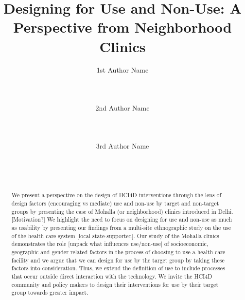 \documentclass{sigchi}
\begin{document}
\title{Designing for Use and Non-Use: A Perspective from Neighborhood Clinics}
\author{
  \alignauthor 1st Author Name\\
    \\
    \\
    \\
  \alignauthor 2nd Author Name\\
    \\
    \\
    \\
  \alignauthor 3rd Author Name\\
    \\
    \\
    \\
}

\maketitle

\begin{abstract}
We present a perspective on the design of HCI4D interventions through the lens of design factors (encouraging vs mediate) use and non-use by target and non-target groups by presenting the case of Mohalla (or neighborhood) clinics introduced in Delhi. [Motivation?] We highlight the need to focus on designing for use and non-use as much as usability by presenting our findings from a multi-site ethnographic study on the use of the health care system [local state-supported]. Our study of the Mohalla clinics demonstrates the role [unpack what influences use/non-use] of socioeconomic, geographic and gender-related factors in the process of choosing to use a health care facility and we argue that we can design for use by the target group by taking these factors into consideration. Thus, we extend the definition of use to include processes that occur outside direct interaction with the technology. We invite the HCI4D community and policy makers to design their interventions for use by their target group towards greater impact.
\end{abstract}
\end{document}
